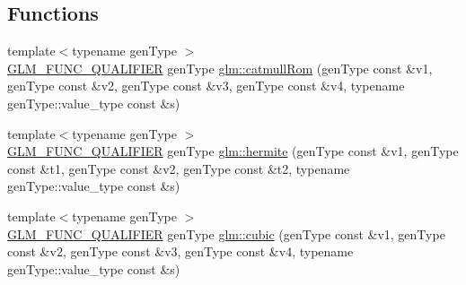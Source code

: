 \subsection*{Functions}
\begin{DoxyCompactItemize}
\item 
{\footnotesize template$<$typename gen\+Type $>$ }\\\hyperlink{setup_8hpp_a33fdea6f91c5f834105f7415e2a64407}{G\+L\+M\+\_\+\+F\+U\+N\+C\+\_\+\+Q\+U\+A\+L\+I\+F\+I\+ER} gen\+Type \hyperlink{group__gtx__spline_ga8119c04f8210fd0d292757565cd6918d}{glm\+::catmull\+Rom} (gen\+Type const \&v1, gen\+Type const \&v2, gen\+Type const \&v3, gen\+Type const \&v4, typename gen\+Type\+::value\+\_\+type const \&s)
\item 
{\footnotesize template$<$typename gen\+Type $>$ }\\\hyperlink{setup_8hpp_a33fdea6f91c5f834105f7415e2a64407}{G\+L\+M\+\_\+\+F\+U\+N\+C\+\_\+\+Q\+U\+A\+L\+I\+F\+I\+ER} gen\+Type \hyperlink{group__gtx__spline_gaa69e143f6374d32f934a8edeaa50bac9}{glm\+::hermite} (gen\+Type const \&v1, gen\+Type const \&t1, gen\+Type const \&v2, gen\+Type const \&t2, typename gen\+Type\+::value\+\_\+type const \&s)
\item 
{\footnotesize template$<$typename gen\+Type $>$ }\\\hyperlink{setup_8hpp_a33fdea6f91c5f834105f7415e2a64407}{G\+L\+M\+\_\+\+F\+U\+N\+C\+\_\+\+Q\+U\+A\+L\+I\+F\+I\+ER} gen\+Type \hyperlink{group__gtx__spline_ga6b867eb52e2fc933d2e0bf26aabc9a70}{glm\+::cubic} (gen\+Type const \&v1, gen\+Type const \&v2, gen\+Type const \&v3, gen\+Type const \&v4, typename gen\+Type\+::value\+\_\+type const \&s)
\end{DoxyCompactItemize}
